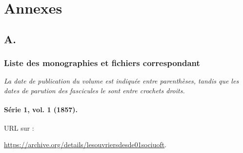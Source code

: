 \part*{Annexes}
\appendix
\renewcommand{\thechapter}{A}
\chapter{A. \lodm}

\section{Liste des monographies et fichiers correspondant}
\label{mapping}

\textit{La date de publication du volume est indiquée entre parenthèses, tandis que les dates de parution des fascicules le sont entre crochets droits.}

\subsection{Série 1, vol. 1 (1857).}
\label{mappings1t1}

URL sur \ia{} : 

\url{https://archive.org/details/lesouvriersdesde01sociuoft}.

